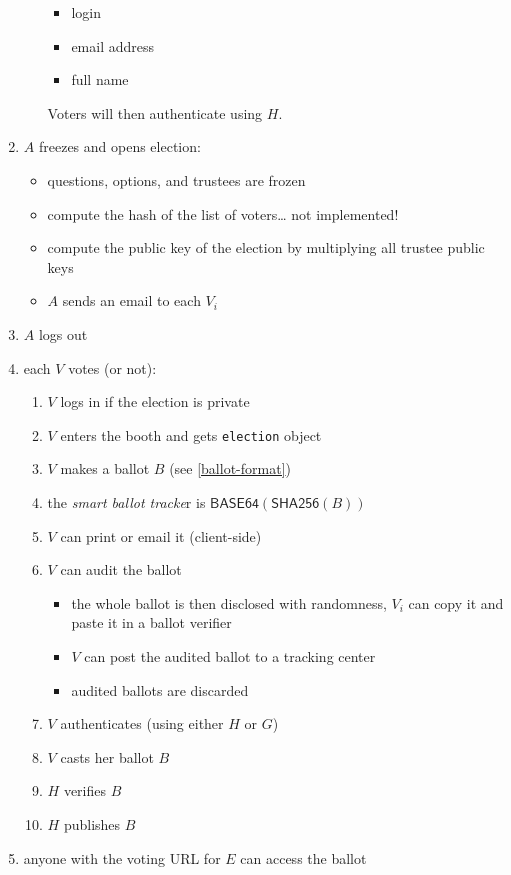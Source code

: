 \documentclass[a4paper]{article}
\begin{document}
\begin{enumerate}
\begin{itemize}
    \begin{itemize}
    \item login
    \item email address
    \item full name
    \end{itemize}
    Voters will then authenticate using $H$.
  \end{itemize}
\item $A$ freezes and opens election:
  \begin{itemize}
  \item questions, options, and trustees are frozen
  \item compute the hash of the list of voters\dots{} not implemented!
  \item compute the public key of the election by multiplying all
    trustee public keys
  \item $A$ sends an email to each $V_i$
  \end{itemize}
\item $A$ logs out
\item each $V$ votes (or not):
  \begin{enumerate}
  \item $V$ logs in if the election is private
  \item $V$ enters the booth and gets \texttt{election} object
  \item $V$ makes a ballot $B$ (see \ref{ballot-format})
  \item the \emph{smart ballot tracke}r is $\textsf{BASE64}(\textsf{SHA256}(B))$
  \item $V$ can print or email it (client-side)
  \item $V$ can audit the ballot
    \begin{itemize}
    \item the whole ballot is then disclosed with randomness, $V_i$ can copy it and paste it in a ballot verifier
    \item $V$ can post the audited ballot to a tracking center
    \item audited ballots are discarded
    \end{itemize}
  \item $V$ authenticates (using either $H$ or $G$)
  \item $V$ casts her ballot $B$
  \item $H$ verifies $B$
  \item $H$ publishes $B$
  \end{enumerate}
\item anyone with the voting URL for $E$ can access the ballot

\end{enumerate}
\end{document}
